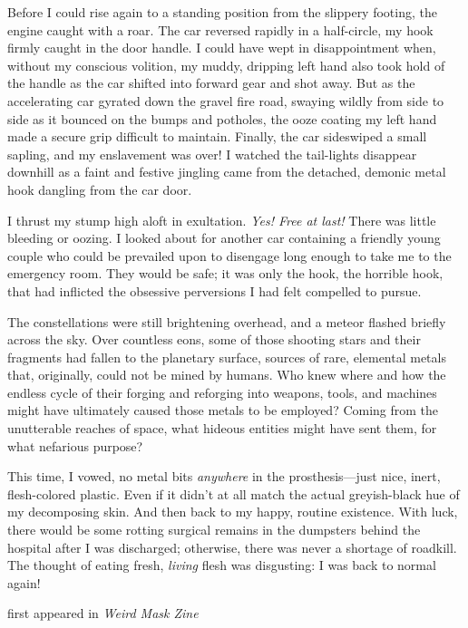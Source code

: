 Before I could rise again to a standing position from the slippery
footing, the engine caught with a roar. The car reversed rapidly in a
half-circle, my hook firmly caught in the door handle. I could have wept
in disappointment when, without my conscious volition, my muddy,
dripping left hand also took hold of the handle as the car shifted into
forward gear and shot away. But as the accelerating car gyrated down the
gravel fire road, swaying wildly from side to side as it bounced on the
bumps and potholes, the ooze coating my left hand made a secure grip
difficult to maintain. Finally, the car sideswiped a small sapling, and
my enslavement was over! I watched the tail-lights disappear downhill as
a faint and festive jingling came from the detached, demonic metal hook
dangling from the car door.

I thrust my stump high aloft in exultation. \emph{Yes! Free at last!}
There was little bleeding or oozing. I looked about for another car
containing a friendly young couple who could be prevailed upon to
disengage long enough to take me to the emergency room. They would be
safe; it was only the hook, the horrible hook, that had inflicted the
obsessive perversions I had felt compelled to pursue.

The constellations were still brightening overhead, and a meteor flashed
briefly across the sky. Over countless eons, some of those shooting
stars and their fragments had fallen to the planetary surface, sources
of rare, elemental metals that, originally, could not be mined by
humans. Who knew where and how the endless cycle of their forging and
reforging into weapons, tools, and machines might have ultimately caused
those metals to be employed? Coming from the unutterable reaches of
space, what hideous entities might have sent them, for what nefarious
purpose?

This time, I vowed, no metal bits \emph{anywhere} in the
prosthesis---just nice, inert, flesh-colored plastic. Even if it didn't
at all match the actual greyish-black hue of my decomposing skin. And
then back to my happy, routine existence. With luck, there would be some
rotting surgical remains in the dumpsters behind the hospital after I
was discharged; otherwise, there was never a shortage of roadkill. The
thought of eating fresh, \emph{living} flesh was disgusting: I was back
to normal again!

first appeared in \emph{Weird Mask Zine}
